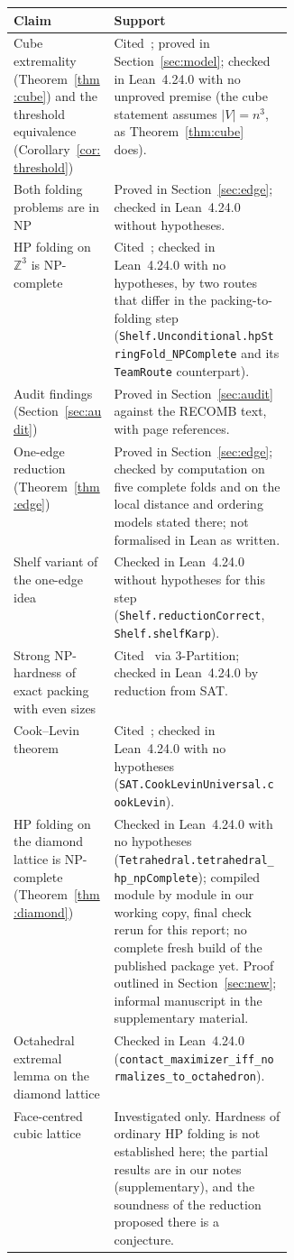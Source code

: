 \documentclass[11pt,letterpaper]{article}
\theoremstyle{definition}
\theoremstyle{remark}
\newcommand{\lean}[1]{\texttt{#1}}
\newcommand{\Z}{\mathbb{Z}}
\begin{document}
\begin{center}
\small
\begin{tabularx}{\linewidth}{@{}>{\raggedright\arraybackslash}p{0.36\linewidth}>{\raggedright\arraybackslash}X@{}}
\toprule
Claim & Support\\
\midrule
Cube extremality (Theorem~\ref{thm:cube}) and the threshold equivalence
  (Corollary~\ref{cor:threshold}) & Cited~\cite{BL98}; proved in Section~\ref{sec:model}; checked in
  Lean~4.24.0 with no unproved premise (the cube statement assumes $|V|=n^3$, as Theorem~\ref{thm:cube}
  does).\\
Both folding problems are in NP & Proved in Section~\ref{sec:edge}; checked in Lean~4.24.0 without
  hypotheses.\\
HP folding on $\Z^3$ is NP-complete & Cited~\cite{BL98}; checked in Lean~4.24.0 with no hypotheses,
  by two routes that differ in the packing-to-folding step
  (\lean{Shelf.Unconditional.hpStringFold\_NPComplete} and its \lean{TeamRoute} counterpart).\\
Audit findings (Section~\ref{sec:audit}) & Proved in Section~\ref{sec:audit} against the RECOMB
  text, with page references.\\
One-edge reduction (Theorem~\ref{thm:edge}) & Proved in Section~\ref{sec:edge}; checked by
  computation on five complete folds and on the local distance and ordering models stated there;
  not formalised in Lean as written.\\
Shelf variant of the one-edge idea & Checked in Lean~4.24.0 without hypotheses for this step
  (\lean{Shelf.reductionCorrect}, \lean{Shelf.shelfKarp}).\\
Strong NP-hardness of exact packing with even sizes & Cited~\cite{GJ79} via 3-Partition; checked in
  Lean~4.24.0 by reduction from SAT.\\
Cook--Levin theorem & Cited~\cite{Cook71,Levin73}; checked in Lean~4.24.0 with no hypotheses
  (\lean{SAT.CookLevinUniversal.cookLevin}).\\
HP folding on the diamond lattice is NP-complete (Theorem~\ref{thm:diamond}) & Checked in
  Lean~4.24.0 with no hypotheses (\lean{Tetrahedral.tetrahedral\_hp\_npComplete}); compiled module by
  module in our working copy, final check rerun for this report; no complete fresh build of the
  published package yet. Proof outlined in
  Section~\ref{sec:new}; informal manuscript in the supplementary material.\\
Octahedral extremal lemma on the diamond lattice & Checked in Lean~4.24.0
  (\lean{contact\_maximizer\_iff\_normalizes\_to\_octahedron}).\\
Face-centred cubic lattice & Investigated only. Hardness of ordinary HP folding is not established
  here; the partial results are in our notes (supplementary), and the soundness of the reduction
  proposed there is a conjecture.\\
\bottomrule
\end{tabularx}
\end{center}
\end{document}
